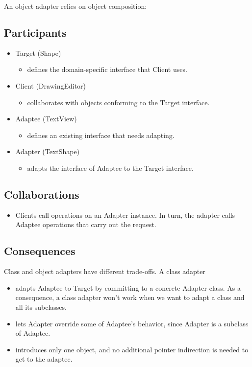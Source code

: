 An object adapter relies on object composition:

\subsection*{Participants}

\begin{itemize}
    \item Target (Shape)
    \begin{itemize}
        \item defines the domain-specific interface that Client uses.
    \end{itemize}
    \item Client (DrawingEditor)
    \begin{itemize}
        \item collaborates with objects conforming to the Target interface.
    \end{itemize}
    \item Adaptee (TextView)
    \begin{itemize}
        \item defines an existing interface that needs adapting.
    \end{itemize}
    \item Adapter (TextShape)
    \begin{itemize}
        \item adapts the interface of Adaptee to the Target interface.
    \end{itemize}
\end{itemize}

\subsection*{Collaborations}

\begin{itemize}
    \item Clients call operations on an Adapter instance. In turn, the adapter calls Adaptee operations that carry out the request.
\end{itemize}

\subsection*{Consequences}

Class and object adapters have different trade-offs. A class adapter
\begin{itemize}
    \item adapts Adaptee to Target by committing to a concrete Adapter class. As a consequence, a class adapter won't work when we want to adapt a class and all its subclasses.
    \item lets Adapter override some of Adaptee's behavior, since Adapter is a subclass of Adaptee.
    \item introduces only one object, and no additional pointer indirection is needed to get to the adaptee.
\end{itemize}

